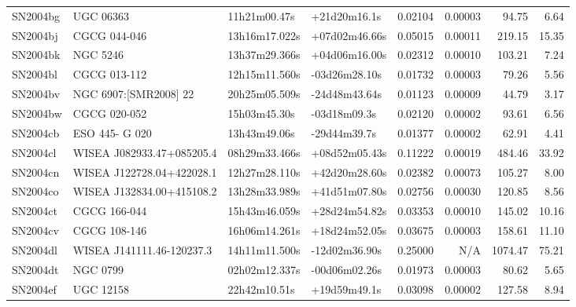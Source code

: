 \begin{longtable}{llllrrrr}
SN2004bg         &                       UGC 06363 &    11h21m00.47s &    +21d20m16.1s &  0.02104 &  0.00003 &    94.75 &        6.64 \\
SN2004bj         &                    CGCG 044-046 &   13h16m17.022s &   +07d02m46.66s &  0.05015 &  0.00011 &   219.15 &       15.35 \\
SN2004bk         &                        NGC 5246 &   13h37m29.366s &   +04d06m16.00s &  0.02312 &  0.00010 &   103.21 &        7.24 \\
SN2004bl         &                    CGCG 013-112 &   12h15m11.560s &   -03d26m28.10s &  0.01732 &  0.00003 &    79.26 &        5.56 \\
SN2004bv         &           NGC 6907:[SMR2008] 22 &   20h25m05.509s &   -24d48m43.64s &  0.01123 &  0.00009 &    44.79 &        3.17 \\
SN2004bw         &                    CGCG 020-052 &    15h03m45.30s &    -03d18m09.3s &  0.02120 &  0.00002 &    93.61 &        6.56 \\
SN2004cb         &                  ESO 445- G 020 &    13h43m49.06s &    -29d44m39.7s &  0.01377 &  0.00002 &    62.91 &        4.41 \\
SN2004cl         &       WISEA J082933.47+085205.4 &   08h29m33.466s &   +08d52m05.43s &  0.11222 &  0.00019 &   484.46 &       33.92 \\
SN2004cn         &       WISEA J122728.04+422028.1 &   12h27m28.110s &   +42d20m28.60s &  0.02382 &  0.00073 &   105.27 &        8.00 \\
SN2004co         &       WISEA J132834.00+415108.2 &   13h28m33.989s &   +41d51m07.80s &  0.02756 &  0.00030 &   120.85 &        8.56 \\
SN2004ct         &                    CGCG 166-044 &   15h43m46.059s &   +28d24m54.82s &  0.03353 &  0.00010 &   145.02 &       10.16 \\
SN2004cv         &                    CGCG 108-146 &   16h06m14.261s &   +18d24m52.05s &  0.03675 &  0.00003 &   158.61 &       11.10 \\
SN2004dl         &       WISEA J141111.46-120237.3 &   14h11m11.500s &   -12d02m36.90s &  0.25000 &      N/A &  1074.47 &       75.21 \\
SN2004dt         &                        NGC 0799 &   02h02m12.337s &   -00d06m02.26s &  0.01973 &  0.00003 &    80.62 &        5.65 \\
SN2004ef         &                       UGC 12158 &    22h42m10.51s &    +19d59m49.1s &  0.03098 &  0.00002 &   127.58 &        8.94 \\

\end{longtable}
